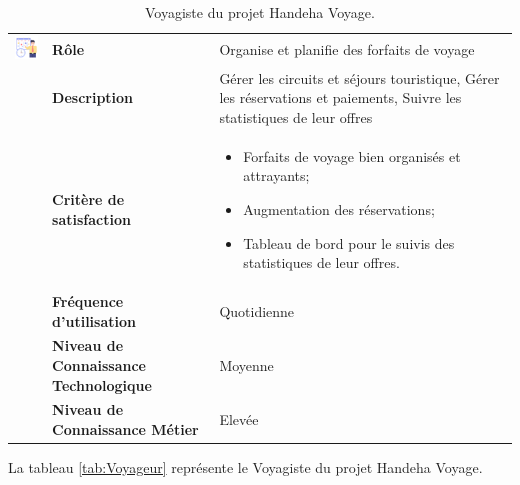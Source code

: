 \documentclass[12pt]{report}
\begin{document}
				\begin{table}[h]
				  \centering
				  \caption{Voyagiste du projet Handeha Voyage.}
				  \label{tab:Voyagiste}
				    \begin{tabular}{|p{3cm}|p{4cm}|p{7cm}|}
					\hline
					\begin{minipage}{3cm}
						\includegraphics[width=2cm]{voyagiste.png}
					\end{minipage} & \textbf{Rôle} & Organise et planifie des forfaits de voyage\\ \cline{2-3}
							& \textbf{Description} & Gérer les circuits et séjours touristique, Gérer les réservations et paiements, Suivre les statistiques de leur offres \\ \cline{2-3}
							& \textbf{Critère de satisfaction}& \begin{itemize}
														\item Forfaits de voyage bien organisés et attrayants;
														\item Augmentation des réservations;
														\item Tableau de bord pour le suivis des statistiques de leur offres.
													\end{itemize}\\ \cline{2-3}
							&\textbf{Fréquence d’utilisation} & Quotidienne \\  \cline{2-3}
							&\textbf{Niveau de Connaissance Technologique} & Moyenne \\  \cline{2-3}
							&\textbf{Niveau de Connaissance Métier} & Elevée \\ 
					\hline
				    \end{tabular}
				\end{table}
				\FloatBarrier				


				La tableau \ref{tab:Voyageur} représente le Voyagiste du projet Handeha Voyage.
\end{document}
